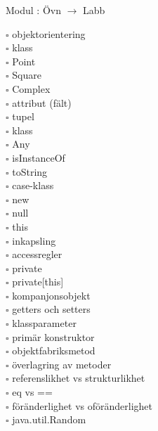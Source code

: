 
    Modul : Övn  $\rightarrow$ Labb 
    \begin{multicols}{3}\SlideFontTiny
    $\square$ objektorientering \\
$\square$ klass \\
$\square$ Point \\
$\square$ Square \\
$\square$ Complex \\
$\square$ attribut (fält) \\
$\square$ tupel \\
$\square$ klass \\
$\square$ Any \\
$\square$ isInstanceOf \\
$\square$ toString \\
$\square$ case-klass \\
$\square$ new \\
$\square$ null \\
$\square$ this \\
$\square$ inkapsling \\
$\square$ accessregler \\
$\square$ private \\
$\square$ private[this] \\
$\square$ kompanjonsobjekt \\
$\square$ getters och setters \\
$\square$ klassparameter \\
$\square$ primär konstruktor \\
$\square$ objektfabriksmetod \\
$\square$ överlagring av metoder \\
$\square$ referenslikhet vs strukturlikhet \\
$\square$ eq vs == \\
$\square$ föränderlighet vs oföränderlighet \\
$\square$ java.util.Random \\
    \end{multicols}
    